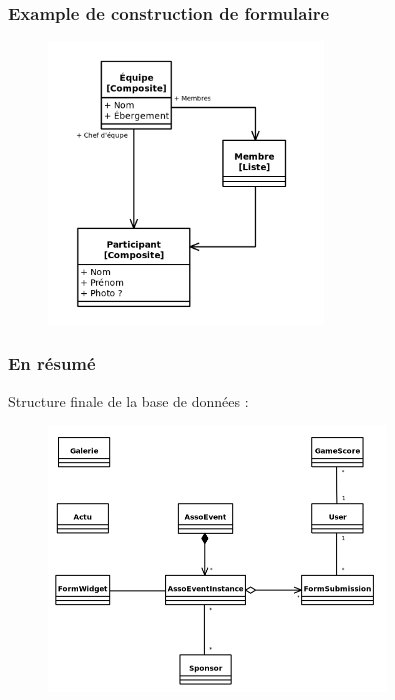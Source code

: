 \begin{frame}
    \frametitle{Example de construction de formulaire}
    \begin{figure}
        \centering
        \includegraphics[width=0.65\textwidth]{pictures/formwidget-struct-example.png}
    \end{figure}
\end{frame}

\begin{frame}
    \frametitle{En résumé}
    Structure finale de la base de données :
    \begin{figure}
        \centering
        \includegraphics[width=0.8\textwidth]{pictures/database.png}
    \end{figure}
\end{frame}
